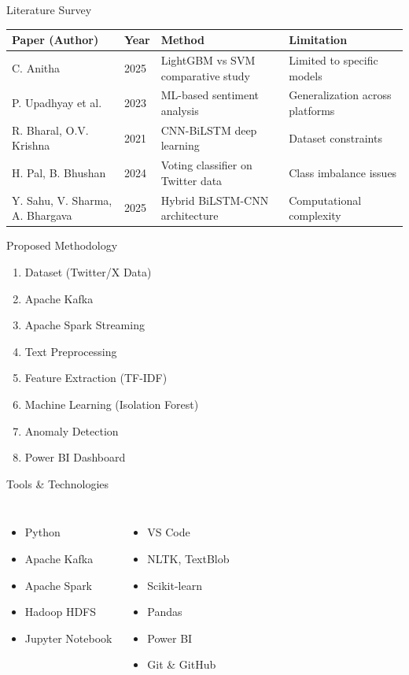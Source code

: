 \documentclass[aspectratio=169]{beamer}
\begin{document}
\begin{frame}{Literature Survey}
\scriptsize
\begin{tabular}{|l|l|l|l|}
\hline
Paper (Author) & Year & Method & Limitation \\
\hline
C. Anitha & 2025 & LightGBM vs SVM comparative study & Limited to specific models \\
\hline
P. Upadhyay et al. & 2023 & ML-based sentiment analysis & Generalization across platforms \\
\hline
R. Bharal, O.V. Krishna & 2021 & CNN-BiLSTM deep learning & Dataset constraints \\
\hline
H. Pal, B. Bhushan & 2024 & Voting classifier on Twitter data & Class imbalance issues \\
\hline
Y. Sahu, V. Sharma, A. Bhargava & 2025 & Hybrid BiLSTM-CNN architecture & Computational complexity \\
\hline
\end{tabular}
\end{frame}


\begin{frame}{Proposed Methodology}
\begin{enumerate}
    \item Dataset (Twitter/X Data)
    \item Apache Kafka
    \item Apache Spark Streaming
    \item Text Preprocessing
    \item Feature Extraction (TF-IDF)
    \item Machine Learning (Isolation Forest)
    \item Anomaly Detection
    \item Power BI Dashboard
\end{enumerate}
\end{frame}

\begin{frame}{Tools \& Technologies}
\begin{columns}
\begin{itemize}
    \item Python
    \item Apache Kafka
    \item Apache Spark
    \item Hadoop HDFS
    \item Jupyter Notebook
\end{itemize}
\begin{itemize}
    \item VS Code
    \item NLTK, TextBlob
    \item Scikit-learn
    \item Pandas
    \item Power BI
    \item Git \& GitHub
\end{itemize}
\end{columns}
\end{frame}
\end{document}
